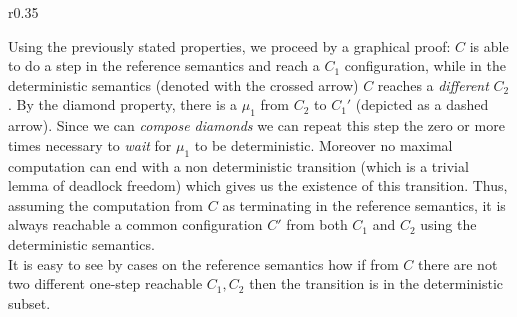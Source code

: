 \documentclass[12pt,a4paper,twoside]{book}
\begin{document}
\begin{wrapfigure}{r}{0.35\textwidth}
  \centering
{}
\end{wrapfigure}

\noindent Using the previously stated properties, we proceed by a graphical proof: $C$ is able to do a step in the reference semantics and reach a $C_1$ configuration, while in the deterministic semantics (denoted with the crossed arrow) $C$ reaches a \emph{different} $C_2$.
By the diamond property, there is a $\mu_1$ from $C_2$ to $C_1'$ (depicted as a dashed arrow). Since we can \emph{compose diamonds} we can repeat this step the zero or more times necessary to \emph{wait} for $\mu_1$ to be deterministic.
Moreover no maximal computation can end with a non deterministic transition (which is a trivial lemma of deadlock freedom) which gives us the existence of this transition.
Thus, assuming the computation from $C$ as terminating in the reference semantics, it is always reachable a common configuration $C'$ from both $C_1$ and $C_2$ using the deterministic semantics.\\
It is easy to see by cases on the reference semantics how if from $C$ there are not two different one-step reachable $C_1, C_2$ then the transition is in the deterministic subset.
\end{document}
